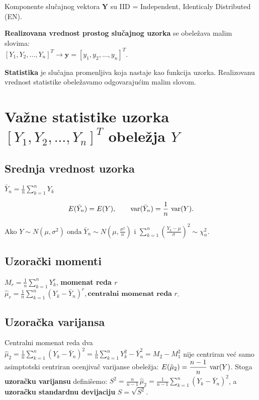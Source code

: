 \documentclass[twoside,titlepage,12pt,a4paper]{book}
\def\var{\mathop{\rm var}\nolimits}
\numberwithin{equation}{chapter}
\begin{document}
Komponente slučajnog vektora $\mathbf{Y}$ su IID = Independent, Identicaly Distributed (EN).

\textbf{Realizovana vrednost prostog slučajnog uzorka} se obeležava malim slovima:\\[3pt]
$[ Y_1, Y_2, \ldots, Y_n ]^T \rightarrow \mathbf{y} = [ y_1, y_2, \ldots, y_n ]^T$.

\textbf{Statistika} je slučajna promenljiva koja nastaje kao funkcija uzorka.
Realizovanu vrednost statistike obeležavamo odgovarajućim malim slovom.


\section{Važne statistike uzorka $[Y_1, Y_2, \ldots, Y_n]^T$ obeležja $Y$}

\subsection{Srednja vrednost uzorka}
$\displaystyle \bar{Y}_n = \frac1n \sum_{k = 1}^n Y_k$

\[
E ( \bar{Y}_n ) = E ( Y ), \quad\quad
\var ( \bar{Y}_n ) = \frac1n \, \var ( Y ).
\]

Ako $\displaystyle Y \sim N ( \mu, \sigma^2 ) \; \mbox{onda} \; \bar{Y}_n \sim N \left( \mu, \frac{\sigma^2}{n} \right)$ i $\displaystyle \sum_{k = 1}^n \left( \frac{Y_k - \mu}{\sigma} \right)^2 \sim \chi_n^2$.

\subsection{Uzorački momenti}

$\displaystyle M_r = \frac1n \sum_{k = 1}^n Y_k^r$, \textbf{momenat reda $r$}\\[3pt]
\indent $\displaystyle \hat{\mu}_r = \frac1n \sum_{k = 1}^n ( Y_k - \bar{Y}_n )^r, \textbf{centralni momenat reda $r$}$.

\subsection{Uzoračka varijansa}

Centralni momenat reda dva
$\displaystyle \hat{\mu}_2 = \frac1n \sum_{k = 1}^n ( Y_k - \bar{Y}_n )^2
= \frac1n \sum_{k = 1}^n Y_k^2  - \bar{Y}_n^2 = M_2 - M_1^2$
nije centriran već samo asimptotski centriran ocenjivač varijanse obeležja:
\(\displaystyle
E ( \hat{\mu}_2 ) = \frac{n - 1}{n} \, \var ( Y )
\).
Stoga \textbf{uzoračku varijansu} definišemo:
$\displaystyle S^2 = \frac{n}{n - 1} \, \hat{\mu}_2 = \frac{1}{n - 1} \sum_{k = 1}^n ( Y_k - \bar{Y}_n )^2$, a \textbf{uzoračku standardnu devijaciju} $S = \sqrt{S^2}$.
\end{document}
